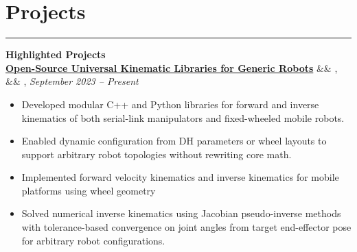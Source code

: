 \documentclass[letterpaper,10pt]{article}
\newcommand{\heading}[1]{%
    \vspace{-5mm} %
    \section*{#1}%
    \vspace{-3mm}%
    \noindent\hrule height 0.5pt %
    \vspace{4mm}%
}
\newcommand{\experience}[5]{%
    \noindent\textbf{#1}%
    \ifx&#2&
    \else
        , \textit{#2}%
    \fi
    \ifx&#3&
    \else
        , #3%
    \fi
    \hfill \textit{#4} \\
    \vspace{-6.8mm}%
    \begin{itemize}[itemsep=-5pt]
        \setlength{\itemindent}{0em}
        #5
    \end{itemize}
    \vspace{1mm}
}
\begin{document}
\vspace{-0.5em}
\heading{Projects}
{\Large \noindent\textbf{Highlighted Projects}} \\

    
\experience
    {\href{https://ryanbarry.me/projects/robotics/kinematics/}{Open-Source Universal Kinematic Libraries for Generic Robots}}
    {}
    {}
    {September 2023 – Present}
    {
        \item Developed modular C++ and Python libraries for forward and inverse kinematics of both serial-link manipulators and fixed-wheeled mobile robots.
        \item Enabled dynamic configuration from DH parameters or wheel layouts to support arbitrary robot topologies without rewriting core math.
        \item Implemented forward velocity kinematics and inverse kinematics for mobile platforms using wheel geometry
        \item Solved numerical inverse kinematics using Jacobian pseudo-inverse methods with tolerance-based convergence on joint angles from target end-effector pose for arbitrary robot configurations.
        
    }
    
\end{document}
